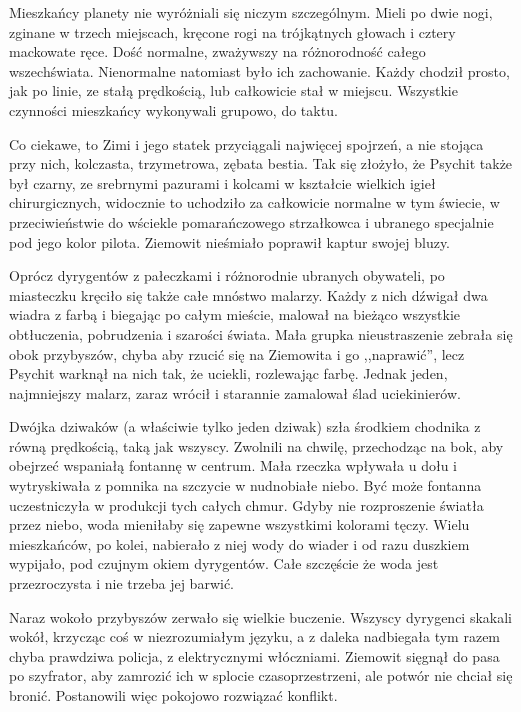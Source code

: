 Mieszkańcy planety nie wyróżniali się niczym szczególnym. Mieli po dwie nogi, zginane w trzech miejscach, kręcone rogi na trójkątnych głowach i cztery mackowate ręce.
Dość normalne, zważywszy na różnorodność całego wszechświata.
Nienormalne natomiast było ich zachowanie. Każdy chodził prosto, jak po linie, ze stałą prędkością, lub całkowicie stał w miejscu.
Wszystkie czynności mieszkańcy wykonywali grupowo, do taktu.

Co ciekawe, to Zimi i jego statek przyciągali najwięcej spojrzeń, a nie stojąca przy nich, kolczasta, trzymetrowa, zębata bestia.
Tak się złożyło, że Psychit także był czarny, ze srebrnymi pazurami i kolcami w kształcie wielkich igieł chirurgicznych, 
widocznie to uchodziło za całkowicie normalne w tym świecie, w przeciwieństwie do wściekle pomarańczowego strzałkowca i
ubranego specjalnie pod jego kolor pilota. Ziemowit nieśmiało poprawił kaptur swojej bluzy.

Oprócz dyrygentów z pałeczkami i różnorodnie ubranych obywateli, po miasteczku kręciło się także całe mnóstwo malarzy.
Każdy z nich dźwigał dwa wiadra z farbą i biegając po całym mieście, malował na bieżąco wszystkie obtłuczenia, pobrudzenia i szarości świata.
Mała grupka nieustraszenie zebrała się obok przybyszów, chyba aby rzucić się na Ziemowita i go ,,naprawić'', lecz Psychit warknął na nich tak, że uciekli, rozlewając farbę.
Jednak jeden, najmniejszy malarz, zaraz wrócił i starannie zamalował ślad uciekinierów.

\divider{}

Dwójka dziwaków (a właściwie tylko jeden dziwak) szła środkiem chodnika z równą prędkością, taką jak wszyscy.
Zwolnili na chwilę, przechodząc na bok, aby obejrzeć wspaniałą fontannę w centrum.
Mała rzeczka wpływała u dołu i wytryskiwała z pomnika na szczycie w nudnobiałe niebo.
Być może fontanna uczestniczyła w produkcji tych całych chmur.
Gdyby nie rozproszenie światła przez niebo, woda mieniłaby się zapewne wszystkimi kolorami tęczy.
Wielu mieszkańców, po kolei, nabierało z niej wody do wiader i od razu duszkiem wypijało, pod czujnym okiem dyrygentów.
Całe szczęście że woda jest przezroczysta i nie trzeba jej barwić.

Naraz wokoło przybyszów zerwało się wielkie buczenie.
Wszyscy dyrygenci skakali wokół, krzycząc coś w niezrozumiałym języku, a z daleka nadbiegała tym razem chyba prawdziwa policja, z elektrycznymi włóczniami.
Ziemowit sięgnął do pasa po szyfrator, aby zamrozić ich w splocie czasoprzestrzeni, ale potwór nie chciał się bronić.
Postanowili więc pokojowo rozwiązać konflikt.

